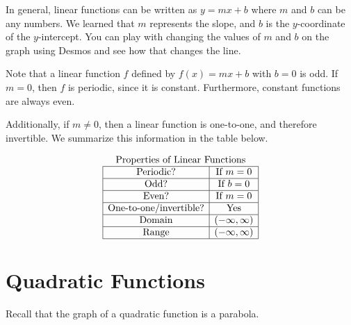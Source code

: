 \documentclass[nooutcomes]{ximera}
\begin{document}
In general, linear functions can be written as $y=mx+b$ where $m$ and $b$ can be any numbers. We learned that $m$ represents the slope, and $b$ is the $y$-coordinate of the $y$-intercept. You can play with changing the values of $m$ and $b$ on the graph using Desmos and see how that changes the line.  

\begin{center}  
\end{center}

Note that a linear function $f$ defined by $f(x) = mx + b$ with $b = 0$ is odd. If $m = 0$, then $f$ is periodic, since it is constant. Furthermore, constant functions are always even.

Additionally, if $m \ne 0$, then a linear function is one-to-one, and therefore invertible. We summarize this information in the table below.

\[
\begin{array}{  c  }
\text{\normalfont Properties of Linear Functions} \\
 \begin{array}{|c|c|}
 \hline
\text{Periodic?} & \text{If } m = 0 \\ \hline
\text{Odd?} & \text{If } b = 0 \\ \hline
\text{Even?} & \text{If } m = 0 \\ \hline
\text{One-to-one/invertible?} & \text{Yes}\\ \hline
\text{Domain} & (-\infty,\infty)\\ \hline
\text{Range} & (-\infty,\infty)\\ \hline
\end{array}
\end{array}
\]

\newpage


\section{Quadratic Functions}

Recall that the graph of a quadratic function is a parabola.
\end{document}
